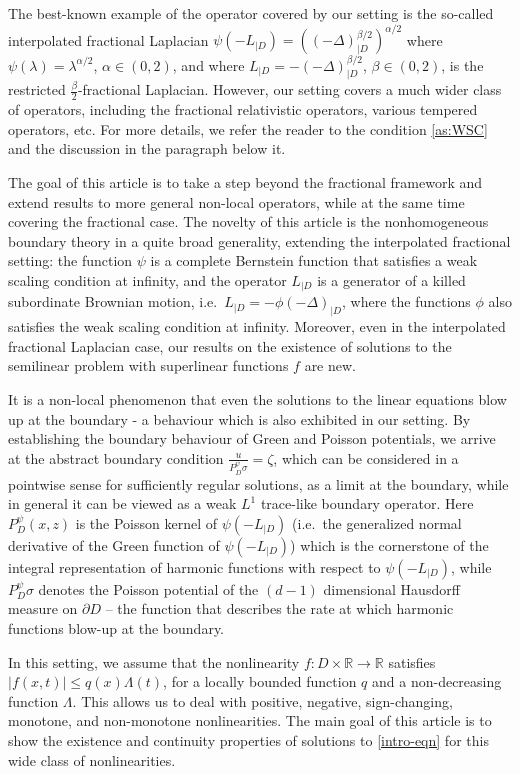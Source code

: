\documentclass[12pt,a4paper,onecolumn]{article}
\theoremstyle{definition}
\newcommand{\R}{\mathbb{R}}
\newcommand{\1}{\mathbf 1}
\newcommand{\Lbase}{L_{|D}}
\newcommand{\Lo}{\psi(-L_{|D})}
\newcommand{\INTFR}{\left((-\Delta)^{\beta/2}_{|D}\right)^{\alpha/2}}
\newcommand{\PDS}{P^{\psi}_{ D}}
\numberwithin{equation}{section}
\begin{document}
    The best-known example of the operator covered by our setting is the so-called interpolated fractional Laplacian $\Lo=\INTFR$ where $\psi(\lambda)=\lambda^{\alpha/2}$, $\alpha\in (0,2)$, and where $\Lbase=-(-\Delta)_{|D}^{\beta/2}$, $\beta\in (0,2)$, is the restricted $\frac\beta2$-fractional Laplacian. However, our setting covers a much wider class of operators, including the fractional relativistic operators, various tempered operators, etc. For more details, we refer the reader to the condition \ref{as:WSC} and the discussion in the paragraph below it.

    The goal of this article is to take a step beyond the fractional framework and extend results to more general non-local operators, while at the same time covering the fractional case. The novelty of this article is the nonhomogeneous boundary theory in a quite broad generality, extending the interpolated fractional setting: the function $\psi$ is a complete Bernstein function that satisfies a weak scaling condition at infinity, and the operator $\Lbase$ is a generator of a killed subordinate Brownian motion, i.e.~$\Lbase=-\phi(-\Delta)_{|D}$, where the functions $\phi$ also satisfies the weak scaling condition at infinity. Moreover, even in the interpolated fractional Laplacian case, our results on the existence of solutions to the semilinear problem with superlinear functions $f$ are new.

    It is a non-local phenomenon that even the solutions to the linear equations blow up at the boundary - a behaviour which is also exhibited in our setting. By establishing the boundary behaviour of Green and Poisson potentials, we arrive at the abstract boundary condition $\frac{u}{\PDS\sigma}=\zeta$, which can be considered in a pointwise sense for sufficiently regular solutions, as a limit at the boundary, while in general it can be viewed as a weak $L^1$  trace-like boundary operator. Here $\PDS (x,z)$ is the Poisson kernel of $\Lo$ (i.e.~the generalized normal derivative of the Green function of $\Lo$) which is the cornerstone of the integral representation of harmonic functions with respect to $\Lo$, while $\PDS\sigma$ denotes the Poisson potential of the $(d-1)$ dimensional Hausdorff measure on $\partial D$ -- the function that describes the rate at which harmonic functions blow-up at the boundary.

    In this setting, we assume that the nonlinearity $f:D\times \R\to \R$ satisfies $|f(x,t)|\le q(x)\Lambda(t)$, for a locally bounded function $q$ and a non-decreasing function $\Lambda$. This allows us to deal with positive, negative, sign-changing, monotone, and non-monotone nonlinearities. The main goal of this article is to show the existence and continuity properties of solutions to \eqref{intro-eqn} for this wide class of nonlinearities.
    
\end{document}

